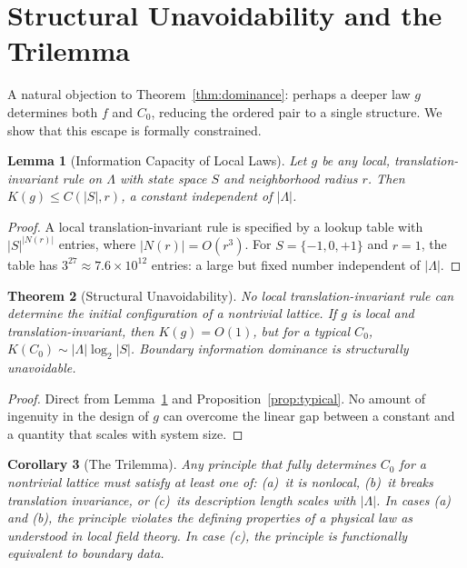 \documentclass[12pt]{article}
\theoremstyle{plain}
\newtheorem{theorem}{Theorem}[section]
\newtheorem{corollary}[theorem]{Corollary}
\newtheorem{lemma}[theorem]{Lemma}
\theoremstyle{definition}
\theoremstyle{remark}
\newcommand{\Lattice}{\Lambda}
\begin{document}
\section{Structural Unavoidability and the Trilemma}

A natural objection to Theorem~\ref{thm:dominance}: perhaps a deeper law $g$ determines both $f$ and $C_0$, reducing the ordered pair to a single structure. We show that this escape is formally constrained.

\begin{lemma}[Information Capacity of Local Laws]\label{lem:capacity}
Let $g$ be any local, translation-invariant rule on $\Lattice$ with state space $S$ and neighborhood radius $r$. Then $K(g) \leq C(|S|, r)$, a constant independent of $|\Lattice|$.
\end{lemma}

\begin{proof}
A local translation-invariant rule is specified by a lookup table with $|S|^{|N(r)|}$ entries, where $|N(r)| = O(r^3)$. For $S = \{-1,0,+1\}$ and $r = 1$, the table has $3^{27} \approx 7.6 \times 10^{12}$ entries: a large but fixed number independent of $|\Lattice|$.
\end{proof}

\begin{theorem}[Structural Unavoidability]\label{thm:unavoidability}
No local translation-invariant rule can determine the initial configuration of a nontrivial lattice. If $g$ is local and translation-invariant, then $K(g) = O(1)$, but for a typical $C_0$, $K(C_0) \sim |\Lattice| \log_2|S|$. Boundary information dominance is structurally unavoidable.
\end{theorem}

\begin{proof}
Direct from Lemma~\ref{lem:capacity} and Proposition~\ref{prop:typical}. No amount of ingenuity in the design of $g$ can overcome the linear gap between a constant and a quantity that scales with system size.
\end{proof}

\begin{corollary}[The Trilemma]\label{cor:trilemma}
Any principle that fully determines $C_0$ for a nontrivial lattice must satisfy at least one of: (a)~it is nonlocal, (b)~it breaks translation invariance, or (c)~its description length scales with $|\Lattice|$. In cases (a) and (b), the principle violates the defining properties of a physical law as understood in local field theory. In case (c), the principle is functionally equivalent to boundary data.
\end{corollary}
\end{document}
